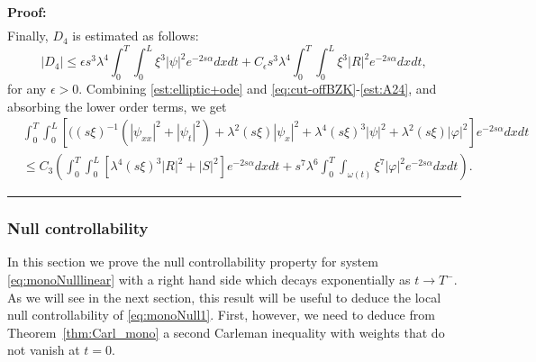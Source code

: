 \documentclass[10pt]{article}
\newenvironment{proof}[1][Proof]
{\noindent\textbf{#1:} }{\hfill\rule{0.5em}{0.5em}}
\def\om{\omega}
\def\\Phivec{\mathbf{\Phi}}
\newcommand{\iiTL}{\int_0^T\!\!\!\!\int_0^L }
\begin{document}
\begin{proof}
\begin{equation}
\begin{alignedat}{2}
	\end{alignedat}
\end{equation}
		Finally, $D_4$ is estimated as follows:
\begin{equation}\label{est:A24}
	|D_4| \leq \epsilon s^3\lambda^4  \iiTL \xi ^3 |\psi|^2  e^{-2s\alpha} dxdt
	+ C_{\epsilon} s^3\lambda^4 \int_0^T \!\!\! \int_{0}^{L}\xi ^3 |R|^2 e^{-2s\alpha} dxdt,
\end{equation}
	for any $\epsilon >0$.
Combining \eqref{est:elliptic+ode} and  \eqref{eq:cut-offBZK}-\eqref{est:A24}, and absorbing the lower order terms,  we get
\begin{equation}\label{est:finalmono}
\begin{alignedat}{2}
	&\iiTL[((s\xi)^{-1}(|\psi_{xx}|^2+|\psi_t|^2)+\lambda^2(s\xi)|\psi_x|^2+\lambda ^4(s\xi)^3|\psi|^2+\lambda ^2 (s\xi)   |\varphi |^2 ]e^{-2s\alpha}dxdt\\
		&\le C_3  \left(\iiTL\![\lambda ^4(s\xi)^3|R|^2+|S|^2] e^{-2s\alpha} dxdt +
		 s^7\lambda^6\int_0^T \!\!\!\int_{\om(t)} \xi ^7  |\varphi|^2e^{-2s\alpha}  dxdt\right).
	\end{alignedat}
\end{equation}
\end{proof}



\subsubsection{Null controllability}

	{ In this section we  prove the null controllability property for system \eqref{eq:monoNulllinear}
	with a right hand side which decays exponentially as $t\rightarrow T^-$. As we will see in the next section,
	this result will be useful to deduce the local null controllability of \eqref{eq:monoNull1}. First, however,  we need to deduce from Theorem~\ref{thm:Carl_mono} a second Carleman inequality with weights that
	do not vanish at $t = 0$}.
	
\end{document}
